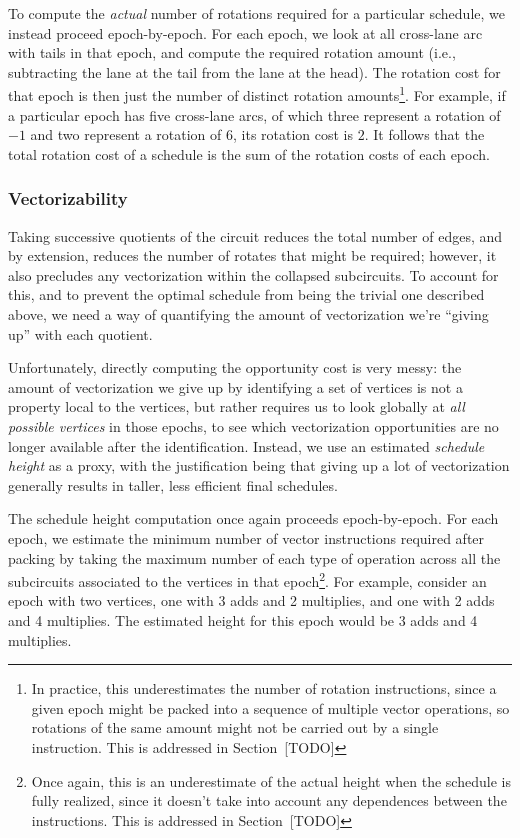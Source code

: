 To compute the {\em actual} number of rotations required for a particular schedule, we instead proceed epoch-by-epoch. 
For each epoch, we look at all cross-lane arc with tails in that epoch, and compute the required rotation amount (i.e., subtracting the lane at the tail from the lane at the head).
The rotation cost for that epoch is then just the number of distinct rotation amounts\footnote{In practice, this underestimates the number of rotation instructions, since a given epoch might be packed into a sequence of multiple vector operations, so rotations of the same amount might not be carried out by a single instruction. This is addressed in Section~[TODO]}.
For example, if a particular epoch has five cross-lane arcs, of which three represent a rotation of $-1$ and two represent a rotation of $6$, its rotation cost is $2$.
It follows that the total rotation cost of a schedule is the sum of the rotation costs of each epoch.

\subsubsection*{Vectorizability}
Taking successive quotients of the circuit reduces the total number of edges, and by extension, reduces the number of rotates that might be required; however, it also precludes any vectorization within the collapsed subcircuits.
To account for this, and to prevent the optimal schedule from being the trivial one described above, we need a way of quantifying the amount of vectorization we're ``giving up'' with each quotient.

Unfortunately, directly computing the opportunity cost is very messy: the amount of vectorization we give up by identifying a set of vertices is not a property local to the vertices, but rather requires us to look globally at {\em all possible vertices} in those epochs, to see which vectorization opportunities are no longer available after the identification.
Instead, we use an estimated {\em schedule height} as a proxy, with the justification being that giving up a lot of vectorization generally results in taller, less efficient final schedules. 

The schedule height computation once again proceeds epoch-by-epoch.
For each epoch, we estimate the minimum number of vector instructions required after packing by taking the maximum number of each type of operation across all the subcircuits associated to the vertices in that epoch\footnote{Once again, this is an underestimate of the actual height when the schedule is fully realized, since it doesn't take into account any dependences between the instructions. This is addressed in Section~[TODO]}.
For example, consider an epoch with two vertices, one with 3 adds and 2 multiplies, and one with 2 adds and 4 multiplies.
The estimated height for this epoch would be 3 adds and 4 multiplies.


